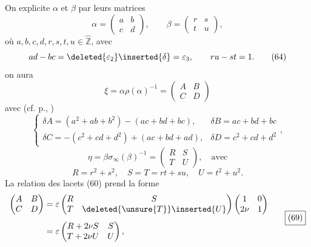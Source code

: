 On explicite $\alpha$ et $\beta$ par leurs matrices
\[
\alpha=\begin{pmatrix}a&b\\c&d\end{pmatrix},\qquad
\beta=\begin{pmatrix}r&s\\t&u\end{pmatrix},
\tag{63}
\]
où $a,b,c,d,r,s,t,u\in\widehat{\mathbb Z}$, avec
\[
ad-bc=\deleted{\varepsilon_2}\inserted{\delta}=\varepsilon_3,\qquad ru-st=1.
\tag{64}
\]
on aura
\[
\xi=\alpha\rho(\alpha)^{-1}=\begin{pmatrix}A&B\\C&D\end{pmatrix}
\tag{65}
\]
avec (cf. p., )
\[
\left\{\begin{array}{ll}
\delta A=(a^2+ab+b^2)-(ac+bd+bc),&\delta B=ac+bd+bc\\[4pt]
\delta C=-(c^2+cd+d^2)+(ac+bd+ad),&\delta D=c^2+cd+d^2
\end{array}\right.,
\tag{66}
\]
\[
\eta=\beta\sigma_\infty(\beta)^{-1}=\begin{pmatrix}R&S\\T&U\end{pmatrix},\quad\text{avec}
\tag{67}
\]
\[
R=r^2+s^2,\quad S=T=rt+su,\quad U=t^2+u^2.
\tag{68}
\]
La relation des lacets (60) prend la forme
\[
\begin{aligned}
\begin{pmatrix}A&B\\C&D\end{pmatrix}
&=\varepsilon\begin{pmatrix}R&S\\T&\deleted{\unsure{T}}\inserted{U}\end{pmatrix}
\begin{pmatrix}1&0\\2\nu&1\end{pmatrix}\\[4pt]
&=\varepsilon\begin{pmatrix}R+2\nu S&S\\T+2\nu U&U\end{pmatrix},
\end{aligned}
\tag*{\boxed{(69)}}
\]


